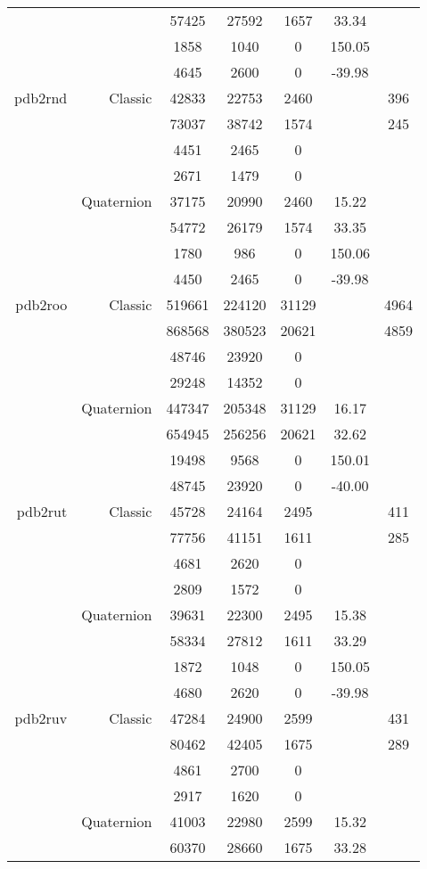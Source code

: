\begin{xltabular}{\textwidth}{r|rcccSc}
& & 57425 & 27592 & 1657 & 33.34 & \\
& & 1858 & 1040 & 0 & 150.05 & \\
& & 4645 & 2600 & 0 & -39.98 & \\ \addlinespace
pdb2rnd & Classic & 42833 & 22753 & 2460 & & 396 \\
& & 73037 & 38742 & 1574 & & 245 \\
& & 4451 & 2465 & 0 & & \\
& & 2671 & 1479 & 0 & & \\
& Quaternion & 37175 & 20990 & 2460 & 15.22 & \\
& & 54772 & 26179 & 1574 & 33.35 & \\
& & 1780 & 986 & 0 & 150.06 & \\
& & 4450 & 2465 & 0 & -39.98 & \\ \addlinespace
pdb2roo & Classic & 519661 & 224120 & 31129 & & 4964 \\
& & 868568 & 380523 & 20621 & & 4859 \\
& & 48746 & 23920 & 0 & & \\
& & 29248 & 14352 & 0 & & \\
& Quaternion & 447347 & 205348 & 31129 & 16.17 & \\
& & 654945 & 256256 & 20621 & 32.62 & \\
& & 19498 & 9568 & 0 & 150.01 & \\
& & 48745 & 23920 & 0 & -40.00 & \\ \addlinespace
pdb2rut & Classic & 45728 & 24164 & 2495 & & 411 \\
& & 77756 & 41151 & 1611 & & 285 \\
& & 4681 & 2620 & 0 & & \\
& & 2809 & 1572 & 0 & & \\
& Quaternion & 39631 & 22300 & 2495 & 15.38 & \\
& & 58334 & 27812 & 1611 & 33.29 & \\
& & 1872 & 1048 & 0 & 150.05 & \\
& & 4680 & 2620 & 0 & -39.98 & \\ \addlinespace
pdb2ruv & Classic & 47284 & 24900 & 2599 & & 431 \\
& & 80462 & 42405 & 1675 & & 289 \\
& & 4861 & 2700 & 0 & & \\
& & 2917 & 1620 & 0 & & \\
& Quaternion & 41003 & 22980 & 2599 & 15.32 & \\
& & 60370 & 28660 & 1675 & 33.28 & \\

\end{xltabular}
